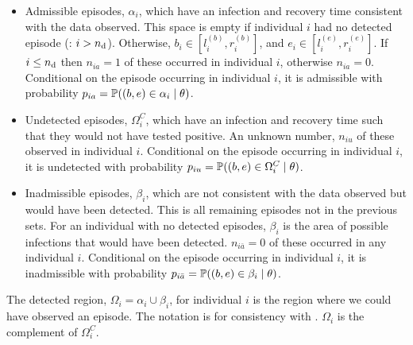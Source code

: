 \documentclass[thesis.tex]{subfiles}
\begin{document}
\begin{itemize}
\item
  Admissible episodes, $\alpha_i$, which have an infection and recovery time consistent with the data observed.
  This space is empty if individual $i$ had no detected episode (\ie: $i > n_\text{d}$).
  Otherwise, $b_i \in [l_i^{(b)}, r_i^{(b)}]$, and $e_i \in [l_i^{(e)}, r_i^{(e)}]$.
  If $i \leq n_\text{d}$ then $n_{ia} =1$ of these occurred in individual $i$, otherwise $n_{ia} = 0$.
  Conditional on the episode occurring in individual $i$, it is admissible with probability $p_{ia} = \operatorname{\mathbb{P}}((b, e) \in \alpha_i \mid \theta)$.
\item
  Undetected episodes, $\Omega_i^C$, which have an infection and recovery time such that they would not have tested positive.
  An unknown number, $n_{iu}$ of these observed in individual $i$.
  Conditional on the episode occurring in individual $i$, it is undetected with probability $p_{iu} = \operatorname{\mathbb{P}}((b, e) \in \Omega^C_i \mid \theta)$.
\item
  Inadmissible episodes, $\beta_i$, which are not consistent with the data observed but would have been
  detected.
  This is all remaining episodes not in the previous sets.
  For an individual with no detected episodes, $\beta_i$ is the area of possible infections that would have been detected.
  $n_{i\bar{a}} = 0$ of these occurred in any individual $i$.
  Conditional on the episode occurring in individual $i$, it is inadmissible with probability $p_{i\bar{a}} = \operatorname{\mathbb{P}}((b, e) \in \beta_i \mid \theta)$.
\end{itemize}

The detected region, $\Omega_i = \alpha_i \cup \beta_i$, for individual $i$ is the region where we could have observed an episode. 
The notation is for consistency with \textcite{heiseyModelling}.
$\Omega_i$ is the complement of $\Omega^C_i$.
\end{document}
